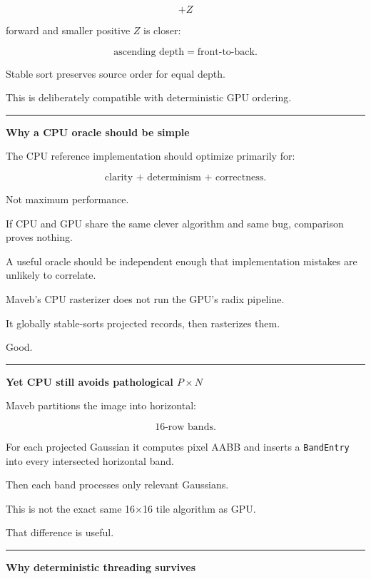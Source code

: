 \[
+Z
\]

forward and smaller positive \(Z\) is closer:

\[
\boxed{
\text{ascending depth}
=
\text{front-to-back}.
}
\]

Stable sort preserves source order for equal depth.

This is deliberately compatible with deterministic GPU ordering.

\begin{center}\rule{0.5\linewidth}{0.5pt}\end{center}

\textbf{Why a CPU oracle should be simple}

The CPU reference implementation should optimize primarily for:

\[
\boxed{
\text{clarity + determinism + correctness}.
}
\]

Not maximum performance.

If CPU and GPU share the same clever algorithm and same bug, comparison proves nothing.

A useful oracle should be independent enough that implementation mistakes are unlikely to correlate.

Maveb's CPU rasterizer does not run the GPU's radix pipeline.

It globally stable-sorts projected records, then rasterizes them.

Good.

\begin{center}\rule{0.5\linewidth}{0.5pt}\end{center}

\textbf{Yet CPU still avoids pathological \(P\times N\)}

Maveb partitions the image into horizontal:

\[
16\text{-row bands}.
\]

For each projected Gaussian it computes pixel AABB and inserts a \texttt{BandEntry} into every intersected horizontal band.

Then each band processes only relevant Gaussians.

This is not the exact same 16×16 tile algorithm as GPU.

That difference is useful.

\begin{center}\rule{0.5\linewidth}{0.5pt}\end{center}

\textbf{Why deterministic threading survives}

